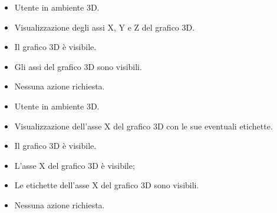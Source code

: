 \UCdsc
    { %
        \begin{itemize}
            \item Utente in ambiente 3D.
        \end{itemize}
    }
    { %
        \begin{itemize}
            \item Visualizzazione degli assi X, Y e Z del grafico 3D.
        \end{itemize}
    }
    { %
        \begin{itemize}
            \item Il grafico 3D è visibile.
        \end{itemize}
    }
    { %
        \begin{itemize}
            \item Gli assi del grafico 3D sono visibili.
        \end{itemize}
    }
    { %
        \begin{itemize}
            \item Nessuna azione richiesta.
        \end{itemize}
    }

\UCdsc
    { %
        \begin{itemize}
            \item Utente in ambiente 3D.
        \end{itemize}
    }
    { %
        \begin{itemize}
            \item Visualizzazione dell'asse X del grafico 3D con le sue eventuali etichette.
        \end{itemize}
    }
    { %
        \begin{itemize}
            \item Il grafico 3D è visibile.
        \end{itemize}
    }
    { %
        \begin{itemize}
            \item L'asse X del grafico 3D è visibile;
            \item Le etichette dell'asse X del grafico 3D sono visibili.
        \end{itemize}
    }
    { %
        \begin{itemize}
            \item Nessuna azione richiesta.
        \end{itemize}
    }

